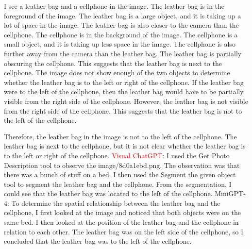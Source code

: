\begin{enumerate}
    I see a leather bag and a cellphone in the image.
    The leather bag is in the foreground of the image. The leather bag is a large object, and it is taking up a lot of space in the image. The leather bag is also closer to the camera than the cellphone.
    The cellphone is in the background of the image. The cellphone is a small object, and it is taking up less space in the image. The cellphone is also further away from the camera than the leather bag.
    The leather bag is partially obscuring the cellphone. This suggests that the leather bag is next to the cellphone.
    The image does not show enough of the two objects to determine whether the leather bag is to the left or right of the cellphone.
    If the leather bag were to the left of the cellphone, then the leather bag would have to be partially visible from the right side of the cellphone. However, the leather bag is not visible from the right side of the cellphone. This suggests that the leather bag is not to the left of the cellphone.
    
    Therefore, the leather bag in the image is not to the left of the cellphone. The leather bag is next to the cellphone, but it is not clear whether the leather bag is to the left or right of the cellphone.   
    \subitem \textcolor{red}{Visual ChatGPT}: I used the Get Photo Description tool to observe the image/8d0a1ebd.png. The observation was that there was a bunch of stuff on a bed. I then used the Segment the given object tool to segment the leather bag and the cellphone. From the segmentation, I could see that the leather bag was located to the left of the cellphone.
    \subitem MiniGPT-4: To determine the spatial relationship between the leather bag and the cellphone, I first looked at the image and noticed that both objects were on the same bed. I then looked at the position of the leather bag and the cellphone in relation to each other. The leather bag was on the left side of the cellphone, so I concluded that the leather bag was to the left of the cellphone. 
\end{enumerate}
